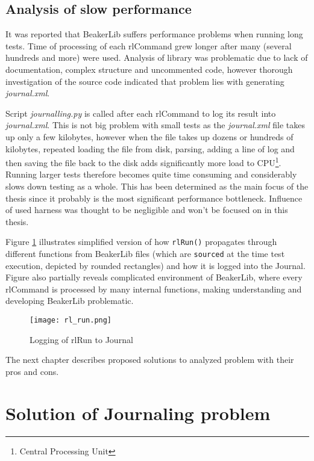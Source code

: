 \section{Analysis of slow performance}
It was reported that BeakerLib suffers performance problems when running long tests. Time of processing of each rlCommand grew longer after many (several hundreds and more) were used. Analysis of library was problematic due to lack of documentation, complex structure and uncommented code, however thorough investigation of the source code indicated that problem lies with generating \textit{journal.xml}. 

Script \textit{journalling.py} is called after each rlCommand to log its result into \textit{journal.xml}. This is not big problem with small tests as the \textit{journal.xml} file takes up only a few kilobytes, however when the file takes up dozens or hundreds of kilobytes, repeated loading the file from disk, parsing, adding a line of log and then saving the file back to the disk adds significantly more load to CPU\footnote{Central Processing Unit}. Running larger tests therefore becomes quite time consuming and considerably slows down testing as a whole.
This has been determined as the main focus of the thesis since it probably is the most significant performance bottleneck. Influence of used harness was thought  to be negligible and won't be focused on in this thesis.

Figure \ref{fig:rl_run} illustrates simplified version of how \texttt{rlRun()} propagates through different functions from BeakerLib files (which are \texttt{sourced} at the time test execution,  depicted by rounded rectangles) and how it is logged into the Journal. Figure also partially reveals complicated environment of BeakerLib, where every rlCommand is processed by many internal functions, making understanding and developing BeakerLib problematic. 

\begin{figure}[h!]
  \texttt{[image: rl\_run.png]}
  \caption{Logging of rlRun to Journal}
  \label{fig:rl_run}
\end{figure}


The next chapter describes proposed solutions to analyzed problem with their pros and cons.


\chapter{Solution of Journaling problem}
\label{solutions}

